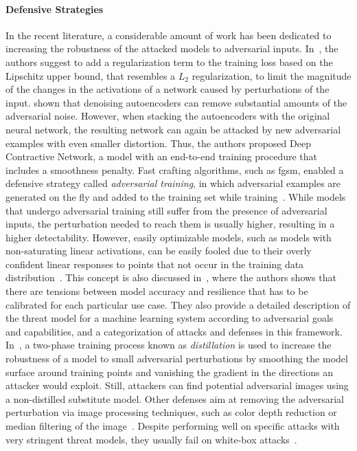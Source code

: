 \paragraph{Defensive Strategies}
In the recent literature, a considerable amount of work has been dedicated to increasing the robustness of the attacked models to adversarial inputs.
In~\cite{szegedy2013intriguing}, the authors suggest to add a regularization term to the training loss based on the Lipschitz upper bound, that resembles a $L_2$ regularization, to limit the magnitude of the changes in the activations of a network caused by perturbations of the input.
\citet{gu2014towards} shown that denoising autoencoders can remove substantial amounts of the adversarial noise.
However, when stacking the autoencoders with the original neural network, the resulting network can again be attacked by new adversarial examples with even smaller distortion.
Thus, the authors proposed Deep Contractive Network, a model with an end-to-end training procedure that includes a smoothness penalty.
Fast crafting algorithms, such as \gls{fgsm}, enabled a defensive strategy called \emph{adversarial training}, in which adversarial examples are generated on the fly and added to the training set while training~\cite{goodfellow2014explaining,huang2015learning}.
While models that undergo adversarial training still suffer from the presence of adversarial inputs, the perturbation needed to reach them is usually higher, resulting in a higher detectability.
However, easily optimizable models, such as models with non-saturating linear activations, can be easily fooled due to their overly confident linear responses to points that not occur in the training data distribution~\cite{goodfellow2014explaining}.
This concept is also discussed in~\cite{papernot2016towards}, where the authors shows that there are tensions between model accuracy and resilience that has to be calibrated for each particular use case.
They also provide a detailed description of the threat model for a machine learning system according to adversarial goals and capabilities, and a categorization of attacks and defenses in this framework.
In~\cite{papernot2015distillation,papernot2016distillation}, a two-phase training process known as \emph{distillation} is used to increase the robustness of a model to small adversarial perturbations by smoothing the model surface around training points and vanishing the gradient in the directions an attacker would exploit.
Still, attackers can find potential adversarial images using a non-distilled substitute model.
Other defenses aim at removing the adversarial perturbation via image processing techniques, such as color depth reduction or median filtering of the image~\cite{xu2017feature,li2017adversarial}.
Despite performing well on specific attacks with very stringent threat models, they usually fail on white-box attacks~\cite{he2017adversarial}.

